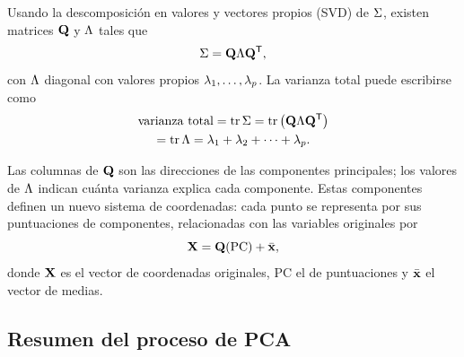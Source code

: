 Usando la descomposici\'on en valores y vectores propios (SVD) de $\Sigma$, existen
matrices $\mathbf{Q}$ y $\Lambda$ tales que
\begin{equation}
  \label{eq:svd_es}
  \Sigma=\mathbf{Q}\Lambda\mathbf{Q}^{\mathsf{T}},
\end{equation}
con $\Lambda$ diagonal con valores propios $\lambda_1,\dots,\lambda_p$. La varianza total
puede escribirse como
\begin{multline}
  \label{eq:traza_es}
  \text{varianza total}=\operatorname{tr}\Sigma=\operatorname{tr}\left( \mathbf{Q}\Lambda\mathbf{Q}^{\mathsf{T}} \right)\\
  =\operatorname{tr}\Lambda=\lambda_1+\lambda_2+\dots+\lambda_p.
\end{multline}

Las columnas de $\mathbf{Q}$ son las direcciones de las componentes principales;
los valores de $\Lambda$ indican cu\'anta varianza explica cada componente. Estas
componentes definen un nuevo sistema de coordenadas: cada punto se representa
por sus puntuaciones de componentes, relacionadas con las variables originales
por
\begin{equation}
  \label{eq:reconstruccion_es}
  \mathbf{X}=\mathbf{Q}(\mathrm{PC})+\bar{\mathbf{x}},
\end{equation}
donde $\mathbf{X}$ es el vector de coordenadas originales, $\mathrm{PC}$ el de
puntuaciones y $\bar{\mathbf{x}}$ el vector de medias.

\subsection{Resumen del proceso de PCA}
\label{subsec:resumen_pca}

